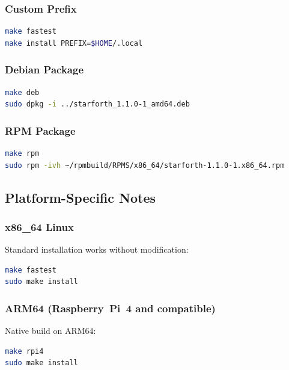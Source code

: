 \subsubsection{Custom Prefix}

\begin{lstlisting}[language=bash]
make fastest
make install PREFIX=$HOME/.local
\end{lstlisting}

\subsubsection{Debian Package}

\begin{lstlisting}[language=bash]
make deb
sudo dpkg -i ../starforth_1.1.0-1_amd64.deb
\end{lstlisting}

\subsubsection{RPM Package}

\begin{lstlisting}[language=bash]
make rpm
sudo rpm -ivh ~/rpmbuild/RPMS/x86_64/starforth-1.1.0-1.x86_64.rpm
\end{lstlisting}

\subsection{Platform-Specific Notes}
\label{sec:install-platforms}

\subsubsection{x86\_64 Linux}

Standard installation works without modification:

\begin{lstlisting}[language=bash]
make fastest
sudo make install
\end{lstlisting}

\subsubsection{ARM64 (Raspberry~Pi~4 and compatible)}

Native build on ARM64:

\begin{lstlisting}[language=bash]
make rpi4
sudo make install
\end{lstlisting}

